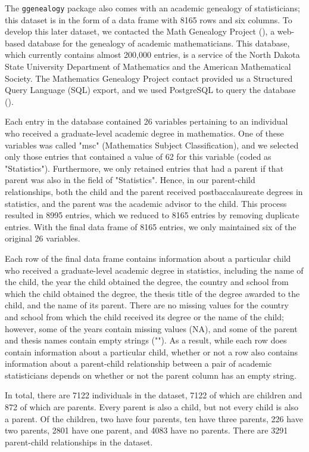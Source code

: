 \documentclass[11pt,a4paper,oldfontcommands,openany]{memoir}
\numberwithin{equation}{section} %
\newcommand{\pkg}[1]{{\texttt{#1}}}
\begin{document}
The \pkg{ggenealogy} package also comes with an academic genealogy of statisticians; this dataset is in the form of a data frame with 8165 rows and six columns. To develop this later dataset, we contacted the Math Genealogy Project (\citealt{mgp}), a web-based database for the genealogy of academic mathematicians. This database, which currently contains almost 200,000 entries, is a service of the North Dakota State University Department of Mathematics and the American Mathematical Society. The Mathematics Genealogy Project contact provided us a Structured Query Language (SQL) export, and we used PostgreSQL to query the database (\citealt{psql}).

Each entry in the database contained 26 variables pertaining to an individual who received a graduate-level academic degree in mathematics. One of these variables was called "msc" (Mathematics Subject Classification), and we selected only those entries that contained a value of 62 for this variable (coded as "Statistics"). Furthermore, we only retained entries that had a parent if that parent was also in the field of "Statistics". Hence, in our parent-child relationships, both the child and the parent received postbaccalaureate degrees in statistics, and the parent was the academic advisor to the child. This process resulted in 8995 entries, which we reduced to 8165 entries by removing duplicate entries. With the final data frame of 8165 entries, we only maintained six of the original 26 variables. 

Each row of the final data frame contains information about a particular child who received a graduate-level academic degree in statistics, including the name of the child, the year the child obtained the degree, the country and school from which the child obtained the degree, the thesis title of the degree awarded to the child, and the name of its parent. There are no missing values for the country and school from which the child received its degree or the name of the child; however, some of the years contain missing values (NA), and some of the parent and thesis names contain empty strings (""). As a result, while each row does contain information about a particular child, whether or not a row also contains information about a parent-child relationship between a pair of academic statisticians depends on whether or not the parent column has an empty string.
 
In total, there are 7122 individuals in the dataset, 7122 of which are children and 872 of which are parents. Every parent is also a child, but not every child is also a parent. Of the children, two have four parents, ten have three parents, 226 have two parents, 2801 have one parent, and 4083 have no parents. There are 3291 parent-child relationships in the dataset.
\end{document}
